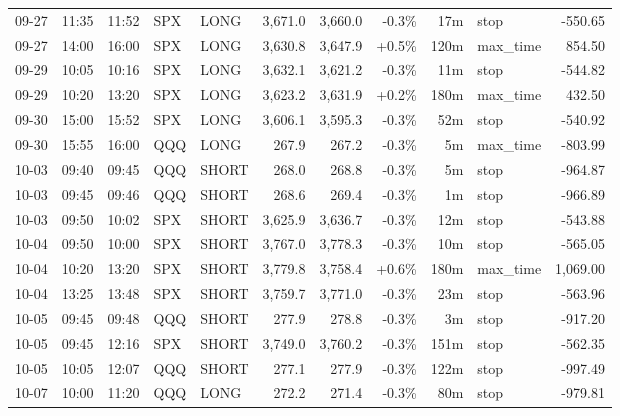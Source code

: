 \documentclass[11pt,a4paper,twoside]{article}
\begin{document}
\begin{center}
\begin{longtable}{>{\color{txtmain}}l l l l l r r r r >{\color{txtmain}}l r}
09-27 & 11:35 & 11:52 & SPX & LONG & 3,671.0 & 3,660.0 & \textcolor{lossred}{-0.3\%} & 17m & stop & \textcolor{lossred}{-550.65} \\
09-27 & 14:00 & 16:00 & SPX & LONG & 3,630.8 & 3,647.9 & \textcolor{wingreen}{+0.5\%} & 120m & max\_time & \textcolor{wingreen}{854.50} \\
09-29 & 10:05 & 10:16 & SPX & LONG & 3,632.1 & 3,621.2 & \textcolor{lossred}{-0.3\%} & 11m & stop & \textcolor{lossred}{-544.82} \\
09-29 & 10:20 & 13:20 & SPX & LONG & 3,623.2 & 3,631.9 & \textcolor{wingreen}{+0.2\%} & 180m & max\_time & \textcolor{wingreen}{432.50} \\
09-30 & 15:00 & 15:52 & SPX & LONG & 3,606.1 & 3,595.3 & \textcolor{lossred}{-0.3\%} & 52m & stop & \textcolor{lossred}{-540.92} \\
09-30 & 15:55 & 16:00 & QQQ & LONG & 267.9 & 267.2 & \textcolor{lossred}{-0.3\%} & 5m & max\_time & \textcolor{lossred}{-803.99} \\
10-03 & 09:40 & 09:45 & QQQ & SHORT & 268.0 & 268.8 & \textcolor{lossred}{-0.3\%} & 5m & stop & \textcolor{lossred}{-964.87} \\
10-03 & 09:45 & 09:46 & QQQ & SHORT & 268.6 & 269.4 & \textcolor{lossred}{-0.3\%} & 1m & stop & \textcolor{lossred}{-966.89} \\
10-03 & 09:50 & 10:02 & SPX & SHORT & 3,625.9 & 3,636.7 & \textcolor{lossred}{-0.3\%} & 12m & stop & \textcolor{lossred}{-543.88} \\
10-04 & 09:50 & 10:00 & SPX & SHORT & 3,767.0 & 3,778.3 & \textcolor{lossred}{-0.3\%} & 10m & stop & \textcolor{lossred}{-565.05} \\
10-04 & 10:20 & 13:20 & SPX & SHORT & 3,779.8 & 3,758.4 & \textcolor{wingreen}{+0.6\%} & 180m & max\_time & \textcolor{wingreen}{1,069.00} \\
10-04 & 13:25 & 13:48 & SPX & SHORT & 3,759.7 & 3,771.0 & \textcolor{lossred}{-0.3\%} & 23m & stop & \textcolor{lossred}{-563.96} \\
10-05 & 09:45 & 09:48 & QQQ & SHORT & 277.9 & 278.8 & \textcolor{lossred}{-0.3\%} & 3m & stop & \textcolor{lossred}{-917.20} \\
10-05 & 09:45 & 12:16 & SPX & SHORT & 3,749.0 & 3,760.2 & \textcolor{lossred}{-0.3\%} & 151m & stop & \textcolor{lossred}{-562.35} \\
10-05 & 10:05 & 12:07 & QQQ & SHORT & 277.1 & 277.9 & \textcolor{lossred}{-0.3\%} & 122m & stop & \textcolor{lossred}{-997.49} \\
10-07 & 10:00 & 11:20 & QQQ & LONG & 272.2 & 271.4 & \textcolor{lossred}{-0.3\%} & 80m & stop & \textcolor{lossred}{-979.81} \\

\end{longtable}
\end{center}
\end{document}
